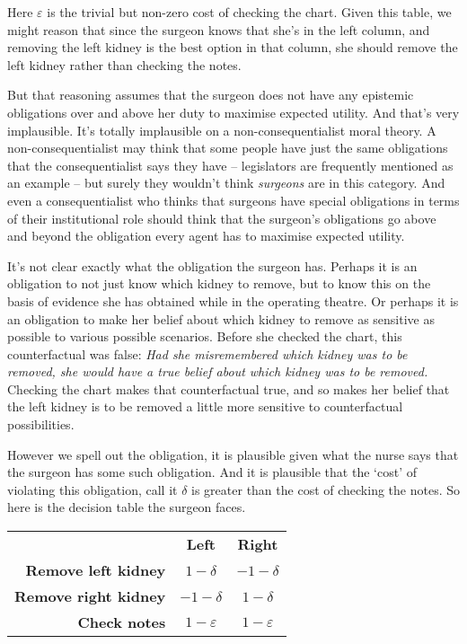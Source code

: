 \documentclass[11pt,oneside]{book}
\begin{document}
\noindent Here \(\varepsilon\) is the trivial but non-zero cost of checking the chart. Given this table, we might reason that since the surgeon knows that she's in the left column, and removing the left kidney is the best option in that column, she should remove the left kidney rather than checking the notes.

But that reasoning assumes that the surgeon does not have any epistemic obligations over and above her duty to maximise expected utility. And that's very implausible. It's totally implausible on a non-consequentialist moral theory. A non-consequentialist may think that some people have just the same obligations that the consequentialist says they have -- legislators are frequently mentioned as an example -- but surely they wouldn't think \textit{surgeons} are in this category. And even a consequentialist who thinks that surgeons have special obligations in terms of their institutional role should think that the surgeon's obligations go above and beyond the obligation every agent has to maximise expected utility.

It's not clear exactly what the obligation the surgeon has. Perhaps it is an obligation to not just know which kidney to remove, but to know this on the basis of evidence she has obtained while in the operating theatre. Or perhaps it is an obligation to make her belief about which kidney to remove as sensitive as possible to various possible scenarios. Before she checked the chart, this counterfactual was false: \textit{Had she misremembered which kidney was to be removed, she would have a true belief about which kidney was to be removed.} Checking the chart makes that counterfactual true, and so makes her belief that the left kidney is to be removed a little more sensitive to counterfactual possibilities. 

However we spell out the obligation, it is plausible given what the nurse says that the surgeon has some such obligation. And it is plausible that the `cost' of violating this obligation, call it \(\delta\) is greater than the cost of checking the notes. So here is the decision table the surgeon faces.

\begin{center}
\begin{tabular}{r c c}
 & \textbf{Left} & \textbf{Right} \\
\textbf{Remove left kidney} & \(1-\delta\) & \(-1-\delta\) \\
\textbf{Remove right kidney} & \(-1-\delta\) & \(1-\delta\) \\
\textbf{Check notes} & \(1-\varepsilon\) & \(1-\varepsilon\) \\
\end{tabular}
\end{center}
\end{document}

